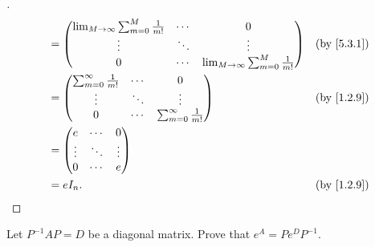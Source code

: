\begin{proof}[]
\begin{align*}
		        & = \begin{pmatrix}
			            \lim_{M \to \infty} \sum_{m = 0}^M  \frac{1}{m!} & \cdots & 0                                              \\
			            \vdots                                           & \ddots & \vdots                                         \\
			            0                                                & \cdots & \lim_{M \to \infty}\sum_{m = 0}^M \frac{1}{m!}
		            \end{pmatrix} &  & \by{5.3.1}                   \\
		        & = \begin{pmatrix}
			            \sum_{m = 0}^\infty \frac{1}{m!} & \cdots & 0                                \\
			            \vdots                           & \ddots & \vdots                           \\
			            0                                & \cdots & \sum_{m = 0}^\infty \frac{1}{m!}
		            \end{pmatrix}                               &  & \by{1.2.9}                                                 \\
		        & = \begin{pmatrix}
			            e      & \cdots & 0      \\
			            \vdots & \ddots & \vdots \\
			            0      & \cdots & e
		            \end{pmatrix}                                                                                                     \\
		        & = e I_n.                                                                                                      &  & \by{1.2.9}
	\end{align*}
\end{proof}

\begin{ex}\label{ex:5.3.21}
	Let \(P^{-1} A P = D\) be a diagonal matrix.
	Prove that \(e^A = P e^D P^{-1}\).
\end{ex}

